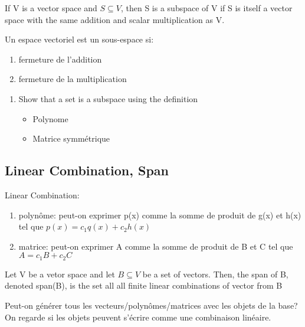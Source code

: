 \documentclass{article}
\begin{document}
\begin{definition}[Subspace]
    If V is a vector space and $ S \subseteq V$, then S is a subspace
    of V if S is itself a vector space with the same addition and
    scalar multiplication as V.
\end{definition}

Un espace vectoriel est un sous-espace si:
\begin{enumerate}
    \item fermeture de l'addition
    \item fermeture de la multiplication
\end{enumerate}

\begin{problem}
    \begin{enumerate}
        \item Show that a set is a subspace using the definition
	    \begin{itemize}
		\item Polynome
		\item Matrice symmétrique
	    \end{itemize}
    \end{enumerate}
\end{problem}

\subsection{Linear Combination, Span}%
\label{sub:Linear Combination, Span}

\begin{intuition}
    Linear Combination:
    \begin{enumerate}
        \item polynôme: peut-on exprimer p(x) comme la somme de produit
	    de g(x) et h(x) tel que $ p(x) = c_1 q(x) + c_2 h(x) $
	\item matrice: peut-on exprimer A comme la somme de produit de
	    B et C tel que $ A = c_1 B + c_2 C $
    \end{enumerate}
\end{intuition}

\begin{definition}[Span]
    Let V be a vetor space and let $ B \subseteq V$ be a set of vectors.
    Then, the span of B, denoted span(B), is the set all all finite
    linear combinations of vector from B
\end{definition}

\begin{intuition}[Span]
    Peut-on générer tous les vecteurs/polynômes/matrices avec les
    objets de la base? On regarde si les objets peuvent s'écrire
    comme une combinaison linéaire.
\end{intuition}
\end{document}
